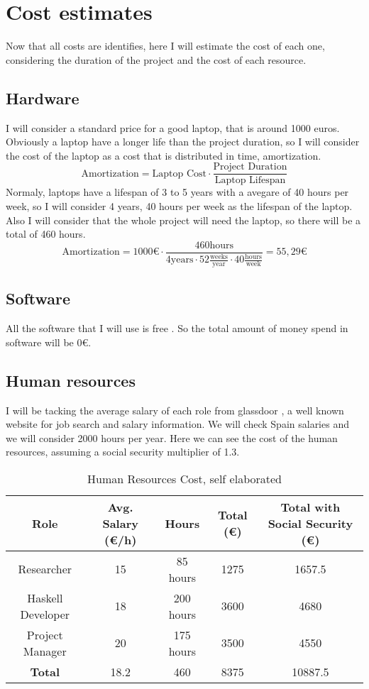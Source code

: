 \section{Cost estimates}
Now that all costs are identifies, here I will estimate the cost of each one, considering the duration of the project and the cost of each resource.
\subsection*{Hardware}
I will consider a standard price for a good laptop, that is around 1000 euros.
Obviously a laptop have a longer life than the project duration, so I will consider the cost of the laptop as a cost that is distributed in time, amortization.
$$
\text{Amortization} = \text{Laptop Cost} \cdot \frac{\text{Project Duration}}{\text{Laptop Lifespan}}
$$ 
Normaly, laptops have a lifespan of 3 to 5 years with a avegare of 40 hours per week, so I will consider 4 years, 40 hours per week as the lifespan of the laptop. \cite{}
Also I will consider that the whole project will need the laptop, so there will be a total of 460 hours. 
$$
\text{Amortization} = 1000 \text{€} \cdot \frac{460 \text{hours}}{4 \text{years} \cdot 52 \frac{\text{weeks}}{\text{year}} \cdot 40 \frac{\text{hours}}{\text{week}}} = 55,29 \text{€}
$$
\subsection*{Software}
All the software that I will use is free \cite{}. So the total amount of money spend in software will be 0€.
\subsection*{Human resources}
I will be tacking the average salary of each role from glassdoor \cite{GlassDoorResearcher} \cite{GlassdoorProjectManager}\cite{GlassdoorSoftwareDeveloper}, a well known website for job search and salary information.
We will check Spain salaries and we will consider 2000 hours per year.
Here we can see the cost of the human resources, assuming a social security multiplier of 1.3.

\begin{table}[H]
    \begin{adjustwidth}{-1in}{-1in} %
    \centering
    \begin{tabular}{|c|c|c|c|c|}
    \hline
    \textbf{Role} & \textbf{Avg. Salary (€/h)} & \textbf{Hours} & \textbf{Total (€)} & \textbf{Total with Social Security (€)} \\ 
    \hline
    Researcher & 15 & 85 hours & 1275 & 1657.5\\
    \hline
    Haskell Developer & 18 & 200 hours & 3600 & 4680\\
    \hline
    Project Manager & 20 & 175 hours & 3500 & 4550\\
    \hline
    \hline
    \textbf{Total} & 18.2 & 460 & 8375 &  10887.5\\
    \hline
    \end{tabular}
    \caption{Human Resources Cost, self elaborated}
    \label{human_resources}
    \end{adjustwidth}
    \end{table}
